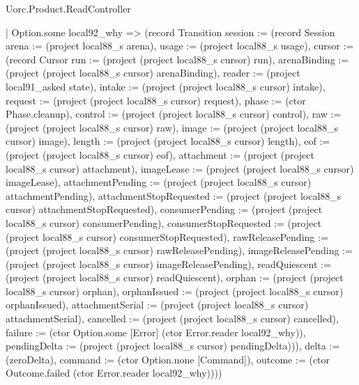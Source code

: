 \begin{lexlean}{Uorc.Product.ReadController}
\begin{semanticmodule}
{      | Option.some local92_why => (record Transition {session := (record Session {arena := (project local88_s arena), usage := (project local88_s usage), cursor := (record Cursor {run := (project (project local88_s cursor) run), arenaBinding := (project (project local88_s cursor) arenaBinding), reader := (project local91_asked state), intake := (project (project local88_s cursor) intake), request := (project (project local88_s cursor) request), phase := (ctor Phase.cleanup), control := (project (project local88_s cursor) control), raw := (project (project local88_s cursor) raw), image := (project (project local88_s cursor) image), length := (project (project local88_s cursor) length), eof := (project (project local88_s cursor) eof), attachment := (project (project local88_s cursor) attachment), imageLease := (project (project local88_s cursor) imageLease), attachmentPending := (project (project local88_s cursor) attachmentPending), attachmentStopRequested := (project (project local88_s cursor) attachmentStopRequested), consumerPending := (project (project local88_s cursor) consumerPending), consumerStopRequested := (project (project local88_s cursor) consumerStopRequested), rawReleasePending := (project (project local88_s cursor) rawReleasePending), imageReleasePending := (project (project local88_s cursor) imageReleasePending), readQuiescent := (project (project local88_s cursor) readQuiescent), orphan := (project (project local88_s cursor) orphan), orphanIssued := (project (project local88_s cursor) orphanIssued), attachmentSerial := (project (project local88_s cursor) attachmentSerial), cancelled := (project (project local88_s cursor) cancelled), failure := (ctor Option.some [Error] (ctor Error.reader local92_why)), pendingDelta := (project (project local88_s cursor) pendingDelta)})}), delta := (zeroDelta), command := (ctor Option.none [Command]), outcome := (ctor Outcome.failed (ctor Error.reader local92_why))}))
}
\end{semanticmodule}
\end{lexlean}
